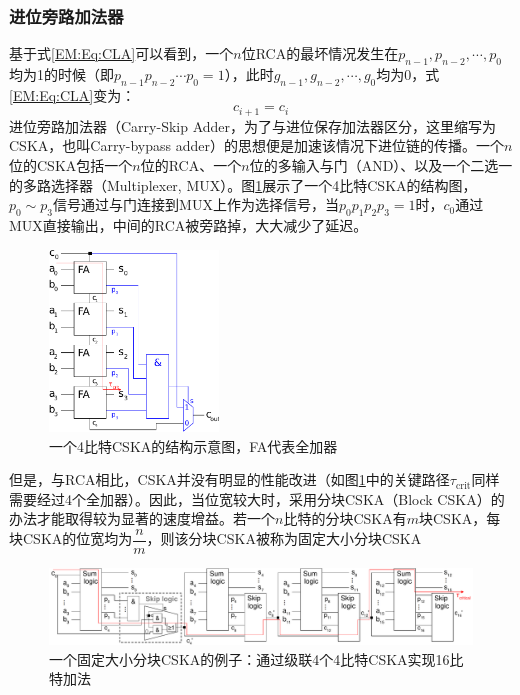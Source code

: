 \subsubsection{进位旁路加法器}

基于式\eqref{EM:Eq:CLA}可以看到，一个$n$位RCA的最坏情况发生在$p_{n-1}, p_{n-2}, \cdots, p_0$均为1的时候（即$p_{n-1} p_{n-2} \cdots p_0=1$），此时$g_{n-1}, g_{n-2}, \cdots, g_0$均为0，式\eqref{EM:Eq:CLA}变为：
\begin{equation}
    c_{i+1} =  c_i
\label{EM:Eq:CSKA_prop}
\end{equation}
进位旁路加法器（Carry-Skip Adder，为了与进位保存加法器区分，这里缩写为CSKA，也叫Carry-bypass adder）的思想便是加速该情况下进位链的传播。一个$n$位的CSKA包括一个$n$位的RCA、一个$n$位的多输入与门（AND）、以及一个二选一的多路选择器（Multiplexer, MUX）。图\ref{EM:Fig:CSKA_4bit}展示了一个4比特CSKA的结构图，$p_0 \sim p_3$信号通过与门连接到MUX上作为选择信号，当$p_0 p_1 p_2 p_3=1$时，$c_0$通过MUX直接输出，中间的RCA被旁路掉，大大减少了延迟。
\begin{figure}[!htb]
    \centering
    \includegraphics[width=0.4\textwidth]{figs/EM-CSKA_4Bit.pdf}
    \caption{一个4比特CSKA的结构示意图，FA代表全加器}
\label{EM:Fig:CSKA_4bit}
\end{figure}

但是，与RCA相比，CSKA并没有明显的性能改进（如图\ref{EM:Fig:CSKA_4bit}中的关键路径$\tau_{\text{crit}}$同样需要经过4个全加器）。因此，当位宽较大时，采用分块CSKA（Block CSKA）的办法才能取得较为显著的速度增益。若一个$n$比特的分块CSKA有$m$块CSKA，每块CSKA的位宽均为$\dfrac{n}{m}$，则该分块CSKA被称为固定大小分块CSKA%
\begin{figure}[!htb]
    \centering
    \includegraphics[width=\textwidth]{figs/EM-CSKA_16Bit.pdf}
    \caption{一个固定大小分块CSKA的例子：通过级联4个4比特CSKA实现16比特加法}
\label{EM:Fig:CSKA_16bit}
\end{figure}


